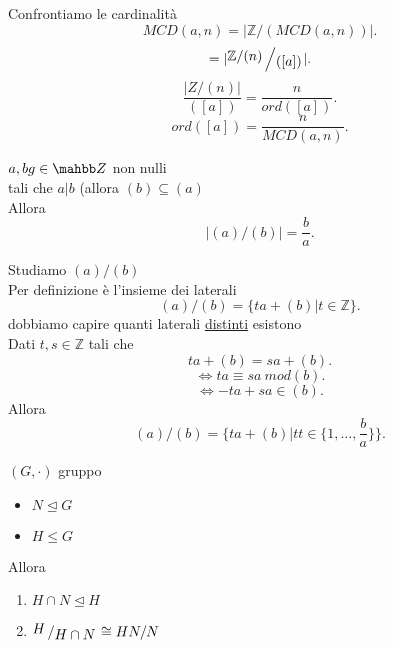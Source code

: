 \documentclass[12px]{article}
\begin{document}
	Confrontiamo le cardinalità\\
	\[
	MCD(a,n) = |\mathbb Z/(MCD(a,n))|
	.\] 
	\[
		= |\bigslant{\mathbb Z/ (n)}{([a])}|

	.\] 
	\[
		\frac {|Z/(n)|}{([a])} = \frac n {ord([a])}
	.\] 
	\[
		ord([a]) = \frac n {MCD(a,n)}
	.\] 
	\begin{lemm}
		$a,bg\in \mahbb Z$ non nulli\\
		tali che  $a|b$ (allora  $(b)\subseteq (a)$ \\
		Allora\\
		\[
		|(a)/(b)| = \frac ba
		.\] 
	\end{lemm}
	\begin{dimo}
		Studiamo $(a)/(b)$\\
		Per definizione è l'insieme dei laterali\\
		 \[
			 (a)/(b) = \{ta + (b) | t\in \mathbb Z\}
		.\] 
		dobbiamo capire quanti laterali \underline{distinti} esistono\\
		Dati $t,s\in \mathbb Z$ tali che\\
		\[
		ta + (b) = sa + (b)
		.\] 
		\[
		\Leftrightarrow ta \equiv sa \ mod(b)
		.\] 
		\[
		\Leftrightarrow -ta + sa \in(b)
		.\] 
		Allora\\
		\[
			(a)/(b) = \{ta + (b)|tt\in\{1,\ldots,\frac ba\}\}
		.\] 
	\end{dimo}
	\begin{teo}
		$(G,\cdot)$ gruppo\\
		\begin{itemize}
			\item $N\trianglelefteq G$\\
			\item  $H\leq G$
		\end{itemize}
		Allora
		\begin{enumerate}
			\item$H\cap N\trianglelefteq H$\\
			\item  $\bigslant H {H\cap N}\cong HN/N$
		\end{enumerate}
	\end{teo}
\end{document}
